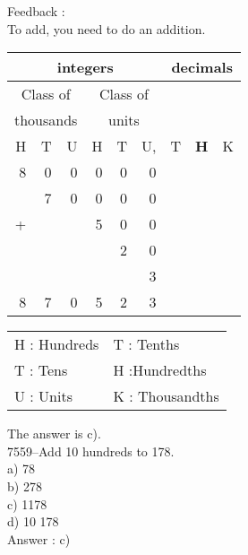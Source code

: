 \documentclass[letterpaper, 12pt]{article}
\begin{document}
Feedback :\\
To add, you need to do an addition.
\begin{center}
\begin{tabular}{|rrr|rrr|rrr|}
\hline
\multicolumn{6}{|c|}{integers} &\multicolumn{3}{|c|}{decimals} \\
\hline
\multicolumn{3}{|c|}{Class of} &\multicolumn{3}{|c|}{Class of} &  \multicolumn{3}{c|}{} \\
\multicolumn{3}{|c|}{thousands} &\multicolumn{3}{|c|}{units} &  \multicolumn{3}{c|}{} \\
\hline
H & T & U &H & T & U, & T\up{th} & \textbf{H\up{th}} & K\up{th} \\
\hline
\hline
8 & 0 & 0 & 0 & 0 & 0 &  & &\\
 & 7 & 0 & 0 & 0 & 0 &  & &\\
+ &  &  & 5 & 0 & 0 &  & &\\
 &  &  &  & 2 & 0 &  & &\\
 &  &  &  &  & 3 &  & &\\
\hline
\hline
 8 & 7 & 0 & 5 & 2 & 3 &  & &
\\
\hline
\end{tabular}
\end{center}

\scriptsize
\begin{center}
\begin{tabular}{ll}
H : Hundreds & T\up{th} : Tenths\\
T : Tens & H\up{th} :Hundredths\\
U : Units & K\up{e} : Thousandths\\
\end{tabular}
\end{center}

\normalsize
The answer is c).\\




7559--Add 10 hundreds to 178.\\

a) 78\\
b) 278\\
c) 1178\\
d) 10 178\\

Answer : c)\\
\end{document}
